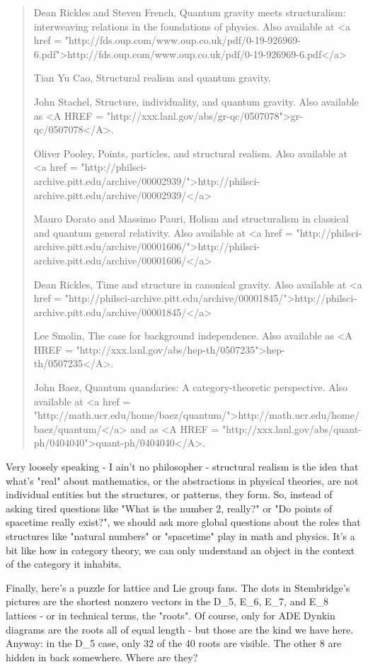 \begin{quote}
Dean Rickles and Steven French, Quantum gravity meets structuralism: 
interweaving relations in the foundations of physics.  Also available at 
<a href = "http://fds.oup.com/www.oup.co.uk/pdf/0-19-926969-6.pdf">http://fds.oup.com/www.oup.co.uk/pdf/0-19-926969-6.pdf</a>

Tian Yu Cao, Structural realism and quantum gravity.

John Stachel, Structure, individuality, and quantum gravity.
Also available as <A HREF = "http://xxx.lanl.gov/abs/gr-qc/0507078">gr-qc/0507078</A>.

Oliver Pooley, Points, particles, and structural realism.  Also
available at <a href = "http://philsci-archive.pitt.edu/archive/00002939/">http://philsci-archive.pitt.edu/archive/00002939/</a>

Mauro Dorato and Massimo Pauri, Holism and structuralism in 
classical and quantum general relativity.  Also available at 
<a href = "http://philsci-archive.pitt.edu/archive/00001606/">http://philsci-archive.pitt.edu/archive/00001606/</a>

Dean Rickles, Time and structure in canonical gravity.  Also
available at <a href = "http://philsci-archive.pitt.edu/archive/00001845/">http://philsci-archive.pitt.edu/archive/00001845/</a>

Lee Smolin, The case for background independence.  Also available
as <A HREF = "http://xxx.lanl.gov/abs/hep-th/0507235">hep-th/0507235</A>.

John Baez, Quantum quandaries: A category-theoretic perspective.
Also available at <a href = "http://math.ucr.edu/home/baez/quantum/">http://math.ucr.edu/home/baez/quantum/</a> and as
<A HREF = "http://xxx.lanl.gov/abs/quant-ph/0404040">quant-ph/0404040</A>.
\end{quote}

Very loosely speaking - I ain't no philosopher - structural realism is
the idea that what's "real" about mathematics, or the
abstractions in physical theories, are not individual entities but the
structures, or patterns, they form.  So, instead of asking tired
questions like "What is the number 2, really?" or "Do
points of spacetime really exist?", we should ask more global
questions about the roles that structures like "natural
numbers" or "spacetime" play in math and physics.  It's
a bit like how in category theory, we can only understand an object in
the context of the category it inhabits.

Finally, here's a puzzle for lattice and Lie group fans.  The dots 
in Stembridge's pictures are the shortest nonzero vectors in the D_{5}, 
E_{6}, E_{7}, and E_{8} lattices - or in technical terms, the "roots".  Of
course, only for ADE Dynkin diagrams are the roots all of equal length -
but those are the kind we have here.  Anyway: in the D_{5} case, only 32 
of the 40 roots are visible.  The other 8 are hidden in back somewhere.  
Where are they?

